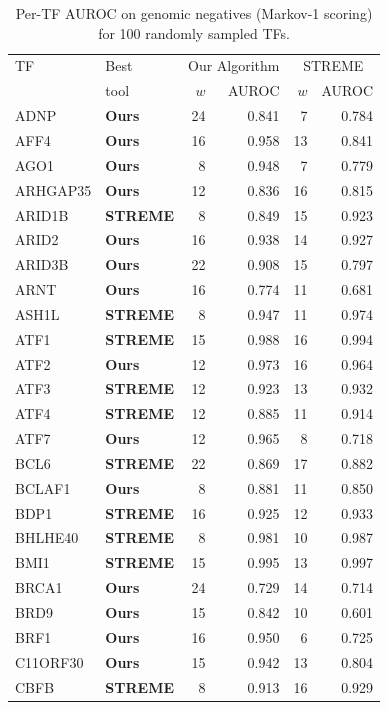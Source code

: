 \begin{table}[!ht]
\centering
\caption{Per-TF AUROC on genomic negatives (Markov-1 scoring) for 100 randomly sampled TFs.}
\label{tab:supp_per_tf}
\scriptsize
\begin{tabular}{llrrrr}
\toprule
TF & Best & \multicolumn{2}{c}{Our Algorithm} & \multicolumn{2}{c}{STREME} \\
 & tool & $w$ & AUROC & $w$ & AUROC \\
\midrule
ADNP & \textbf{Ours} & 24 & 0.841 & 7 & 0.784 \\
AFF4 & \textbf{Ours} & 16 & 0.958 & 13 & 0.841 \\
AGO1 & \textbf{Ours} & 8 & 0.948 & 7 & 0.779 \\
ARHGAP35 & \textbf{Ours} & 12 & 0.836 & 16 & 0.815 \\
ARID1B & \textbf{STREME} & 8 & 0.849 & 15 & 0.923 \\
ARID2 & \textbf{Ours} & 16 & 0.938 & 14 & 0.927 \\
ARID3B & \textbf{Ours} & 22 & 0.908 & 15 & 0.797 \\
ARNT & \textbf{Ours} & 16 & 0.774 & 11 & 0.681 \\
ASH1L & \textbf{STREME} & 8 & 0.947 & 11 & 0.974 \\
ATF1 & \textbf{STREME} & 15 & 0.988 & 16 & 0.994 \\
ATF2 & \textbf{Ours} & 12 & 0.973 & 16 & 0.964 \\
ATF3 & \textbf{STREME} & 12 & 0.923 & 13 & 0.932 \\
ATF4 & \textbf{STREME} & 12 & 0.885 & 11 & 0.914 \\
ATF7 & \textbf{Ours} & 12 & 0.965 & 8 & 0.718 \\
BCL6 & \textbf{STREME} & 22 & 0.869 & 17 & 0.882 \\
BCLAF1 & \textbf{Ours} & 8 & 0.881 & 11 & 0.850 \\
BDP1 & \textbf{STREME} & 16 & 0.925 & 12 & 0.933 \\
BHLHE40 & \textbf{STREME} & 8 & 0.981 & 10 & 0.987 \\
BMI1 & \textbf{STREME} & 15 & 0.995 & 13 & 0.997 \\
BRCA1 & \textbf{Ours} & 24 & 0.729 & 14 & 0.714 \\
BRD9 & \textbf{Ours} & 15 & 0.842 & 10 & 0.601 \\
BRF1 & \textbf{Ours} & 16 & 0.950 & 6 & 0.725 \\
C11ORF30 & \textbf{Ours} & 15 & 0.942 & 13 & 0.804 \\
CBFB & \textbf{STREME} & 8 & 0.913 & 16 & 0.929 \\

\end{tabular}
\end{table}

